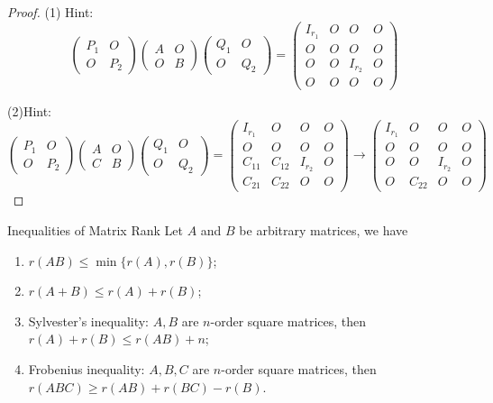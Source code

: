 \begin{proof}
  (1) Hint:
  \begin{equation}
    \begin{pmatrix}P_1&O\\O&P_2\end{pmatrix}
    \begin{pmatrix}A&O\\O&B\end{pmatrix}
    \begin{pmatrix}Q_1&O\\O&Q_2\end{pmatrix}
    =\begin{pmatrix}I_{r_1}&O&O&O\\O&O&O&O\\O&O&I_{r_2}&O\\O&O&O&O\end{pmatrix}
  \end{equation}

  (2)Hint: 
  \begin{equation}
    \begin{pmatrix}P_1&O\\O&P_2\end{pmatrix}
    \begin{pmatrix}A&O\\C&B\end{pmatrix}
    \begin{pmatrix}Q_1&O\\O&Q_2\end{pmatrix}
    =\begin{pmatrix}I_{r_1}&O&O&O\\O&O&O&O\\C_{11}&C_{12}&I_{r_2}&O\\C_{21}&C_{22}&O&O\end{pmatrix}\to\begin{pmatrix}I_{r_1}&O&O&O\\O&O&O&O\\O&O&I_{r_2}&O\\O&C_{22}&O&O\end{pmatrix}
  \end{equation}
\end{proof}

\begin{theorem}{Inequalities of Matrix Rank}{}
  Let $A$ and $B$ be arbitrary matrices, we have
  \begin{enumerate}
  \item $r(AB) \leq \min\{r(A), r(B)\}$;
  \item $r(A + B) \leq r(A) + r(B)$;
  \item Sylvester's inequality: $A, B$ are $n$-order square matrices, then $r(A)
    + r(B) \leq r(AB) + n$;
  \item Frobenius inequality: $A, B, C$ are $n$-order square matrices,
    then $r(ABC) \geq r(AB) + r(BC) - r(B)$.
  \end{enumerate}
\end{theorem}

